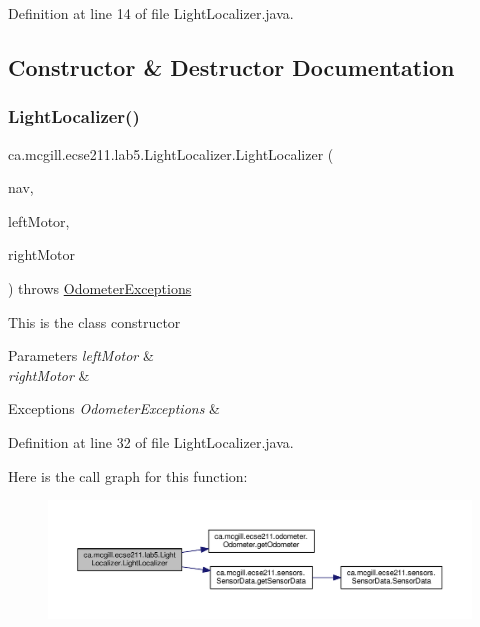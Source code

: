 Definition at line 14 of file Light\+Localizer.\+java.



\subsection{Constructor \& Destructor Documentation}
\mbox{\label{classca_1_1mcgill_1_1ecse211_1_1lab5_1_1_light_localizer_a83dbb9eaea19092e27f6f9acdd35d37a}} 
\subsubsection{\texorpdfstring{Light\+Localizer()}{LightLocalizer()}}
{\footnotesize\ttfamily ca.\+mcgill.\+ecse211.\+lab5.\+Light\+Localizer.\+Light\+Localizer (\begin{DoxyParamCaption}\item[{\hyperlink{classca_1_1mcgill_1_1ecse211_1_1lab5_1_1_navigation}{Navigation}}]{nav,  }\item[{E\+V3\+Large\+Regulated\+Motor}]{left\+Motor,  }\item[{E\+V3\+Large\+Regulated\+Motor}]{right\+Motor }\end{DoxyParamCaption}) throws \hyperlink{classca_1_1mcgill_1_1ecse211_1_1odometer_1_1_odometer_exceptions}{Odometer\+Exceptions}}

This is the class constructor


\begin{DoxyParams}{Parameters}
{\em left\+Motor} & \\
\hline
{\em right\+Motor} & \\
\hline
\end{DoxyParams}

\begin{DoxyExceptions}{Exceptions}
{\em Odometer\+Exceptions} & \\
\hline
\end{DoxyExceptions}


Definition at line 32 of file Light\+Localizer.\+java.

Here is the call graph for this function\+:
\nopagebreak
\begin{figure}[H]
\begin{center}
\leavevmode
\includegraphics[width=350pt]{classca_1_1mcgill_1_1ecse211_1_1lab5_1_1_light_localizer_a83dbb9eaea19092e27f6f9acdd35d37a_cgraph}
\end{center}
\end{figure}


